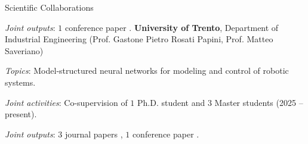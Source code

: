 \begin{rubric}{Scientific Collaborations}
    \par \textit{Joint outputs}: $1$ conference paper \cite{Piccinini2026_roboracer}.
%
\entry*[Italy]%
	\textbf{University of Trento}, Department of Industrial Engineering (Prof. Gastone Pietro Rosati Papini, Prof. Matteo Saveriano)
    \par \textit{Topics}: Model-structured neural networks for modeling and control of robotic systems.
    \par \textit{Joint activities}: Co-supervision of $1$ Ph.D. student and $3$ Master students (2025 -- present). 
    \par \textit{Joint outputs}: $3$ journal papers \cite{Mungiello2026,PiccininiABS2025,piccinini2026physicspriors}, $1$ conference paper \cite{Piccinini_A2RL_2025}.
\end{rubric}
